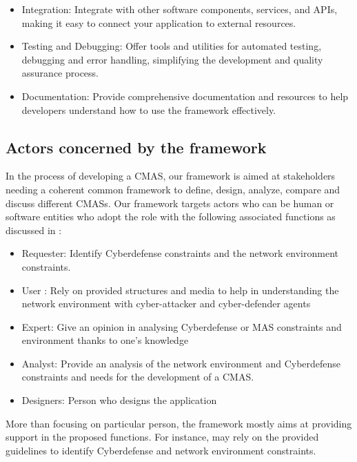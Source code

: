 \documentclass[conference]{IEEEtran}
\begin{document}
\begin{itemize}
    \item Integration: Integrate with other software components, services, and APIs, making it easy to connect your application to external resources.
    \item Testing and Debugging: Offer tools and utilities for automated testing, debugging and error handling, simplifying the development and quality assurance process.
    \item Documentation: Provide comprehensive documentation and resources to help developers understand how to use the framework effectively.
\end{itemize}

\subsection{Actors concerned by the framework}


In the process of developing a CMAS, our framework is aimed at stakeholders needing a coherent common framework to define, design, analyze, compare and discuss different CMASs. Our framework targets actors who can be human or software entities who adopt the role with the following associated functions as discussed in \cite{jamont2005diamond}:

\begin{itemize}
    \item Requester: Identify Cyberdefense constraints and the network environment constraints.
    \item User : Rely on provided structures and media to help in understanding the network environment with cyber-attacker and cyber-defender agents
    \item Expert: Give an opinion in analysing Cyberdefense or MAS constraints and environment thanks to one's knowledge
    \item Analyst: Provide an analysis of the network environment and Cyberdefense constraints and needs for the development of a CMAS.
    \item Designers: Person who designs the application
\end{itemize}

More than focusing on particular person, the framework mostly aims at providing support in the proposed functions. For instance,  may rely on the provided guidelines to identify Cyberdefense and network environment constraints.
\end{document}

